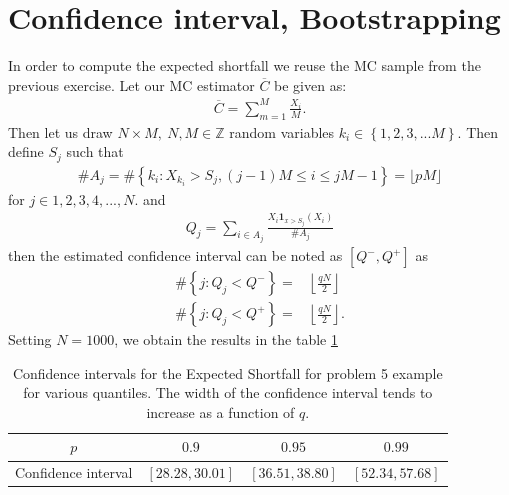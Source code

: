 \documentclass[a4paper,11pt]{article}
\newcommand{\parent}[1]{\left( {#1} \right)}
\newcommand{\sset}[1]{\left\lbrace {#1} \right\rbrace }
\newcommand{\ssum}[2]{\displaystyle\sum\limits_{#1}^{#2}}
\begin{document}
\section*{Confidence interval, Bootstrapping}

In order to compute the expected shortfall we reuse the MC sample from the previous exercise.
Let our MC estimator $\overline C$ be given as:
\begin{align}
\overline C = \ssum{m=1}{M} \frac{X_i}{M}.
\end{align}
Then let us draw $N\times M, ~ N,M \in \mathbb Z$ random variables
$k_i \in \sset{1,2,3,...M}$. Then define $S_j$ such that
\begin{align}
\# A_j =\# \sset{k_i: X_{k_i}>S_j, \parent{j-1 }M \leq i \leq jM-1} = \lfloor pM \rfloor
\end{align}
for $j \in {1,2,3,4,...,N}$. and
\begin{align}
Q _j = \ssum{i \in A_j}{} \frac{X_i \mathbf{1}_{x>S_j} \parent{X_i}}{\# A_j}
\end{align}
then the estimated confidence interval can be noted as $[Q^-,Q^+]$
as
\begin{align}
\# \sset{j: Q_j<Q^{-}} =& \left \lfloor \frac{qN}{2} \right \rfloor \\
\# \sset{j: Q_j<Q^{+}} =&  \left \lfloor \frac{qN}{2} \right \rfloor .
\end{align}
Setting $N=1000$, we obtain the results in the table \ref{tb:BS}

\begin{table}
\begin{center}
\begin{tabular}{c c c c }
  $p$ & $0.9$  & $0.95$  &  $0.99$ \\
  \hline
Confidence interval & $[28.28, 30.01]$ & $[36.51, 38.80]$ & $[52.34, 57.68]$ 
\end{tabular}
\end{center}
\caption{\label{tb:BS}
Confidence intervals for the Expected Shortfall for problem 5 example
for various quantiles.
The width of the confidence interval tends to increase as a function of $q$.	
}
\end{table}
\end{document}
